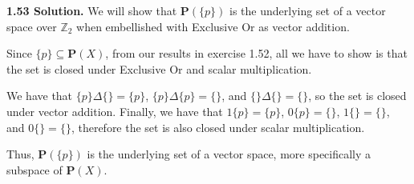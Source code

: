 \textbf{1.53 Solution.} We will show that $\textbf{P}(\{p\})$ is the underlying set of a vector space over $\mathbb{Z}_2$ when embellished with Exclusive Or as vector addition.

Since $\{p\}\subseteq\textbf{P}(X)$, from our results in exercise 1.52, all we have to show is that the set is closed under Exclusive Or and scalar multiplication.

We have that $\{p\}\Delta\{\}=\{p\}$, $\{p\}\Delta\{p\}=\{\}$, and $\{\}\Delta\{\}=\{\}$, so the set is closed under vector addition. Finally, we have that $1\{p\}=\{p\}$, $0\{p\}=\{\}$, $1\{\}=\{\}$, and $0\{\}=\{\}$, therefore the set is also closed under scalar multiplication.

Thus, $\textbf{P}(\{p\})$ is the underlying set of a vector space, more specifically a subspace of $\textbf{P}(X)$.

